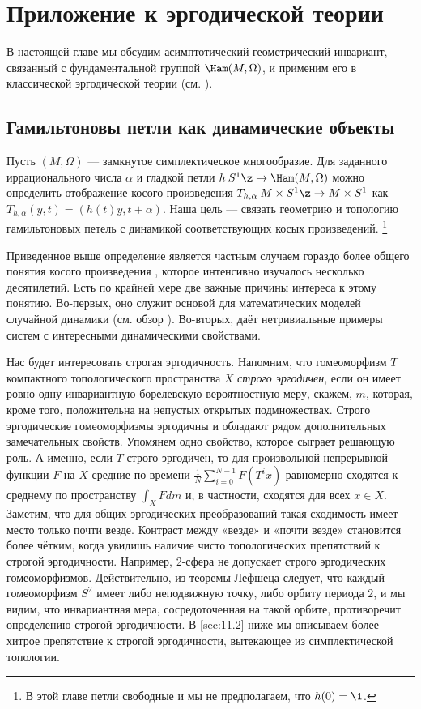 \chapter[Эргодическая теория]{Приложение к эргодической теории}

В настоящей главе мы обсудим асимптотический геометрический инвариант, связанный с фундаментальной группой $\Ham(M, \Omega)$, и применим его в классической эргодической теории (см. \cite{P9}).

\section{Гамильтоновы петли как динамические объекты}\label{sec:11.1}

Пусть $(M,\Omega)$ --- замкнутое симплектическое многообразие.
Для заданного иррационального числа $\alpha$ и гладкой петли $h \: S^1 \z\to \Ham(M, \Omega)$ можно определить отображение косого произведения $T_{h,\alpha} \: M \times S^1 \z\to M\times S^1$ как $T_{h,\alpha} (y, t) = (h(t)y, t + \alpha)$.
Наша цель --- связать геометрию и топологию гамильтоновых петель с динамикой соответствующих косых произведений.%
\footnote{В этой главе петли свободные и мы не предполагаем, что $h(0) = \1$.}

Приведенное выше определение является частным случаем гораздо более общего понятия косого произведения  \cite[с. 231]{CFS}, которое интенсивно изучалось несколько десятилетий.
Есть по крайней мере две важные причины интереса к этому понятию.
Во-первых, оно служит основой для математических моделей случайной динамики (см. обзор \cite{Ki}).
Во-вторых, даёт нетривиальные примеры систем с интересными динамическими свойствами.

Нас будет интересовать строгая эргодичность.
Напомним, что гомеоморфизм $T$ компактного топологического пространства $X$ \emph{строго эргодичен}, если он имеет ровно одну инвариантную борелевскую вероятностную меру, скажем, $m$, которая, кроме того, положительна на непустых открытых подмножествах.
Строго эргодические гомеоморфизмы эргодичны и обладают рядом дополнительных замечательных свойств.
Упомянем одно свойство, которое сыграет решающую роль.
А именно, если $T$ строго эргодичен, то для произвольной непрерывной функции $F$ на $X$ средние по времени $\tfrac1N\sum_{i=0}^{N-1}F(T^ix)$ равномерно сходятся к среднему по пространству $\int_XFdm$ и, в частности, сходятся для всех $x \in X$.
Заметим, что для общих эргодических преобразований такая сходимость имеет место только почти везде.
Контраст между «везде» и «почти везде» становится более чётким, когда увидишь наличие чисто топологических препятствий к строгой эргодичности.
Например, 2-сфера не допускает строго эргодических гомеоморфизмов.
Действительно, из теоремы Лефшеца следует, что каждый гомеоморфизм $S^2$ имеет либо неподвижную точку, либо орбиту периода $2$, и мы видим, что инвариантная мера, сосредоточенная на такой орбите, противоречит определению строгой эргодичности.
В \ref{sec:11.2} ниже мы описываем более хитрое препятствие к строгой эргодичности, вытекающее из симплектической топологии.

